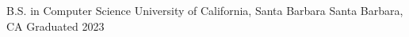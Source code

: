 \documentclass[12pt, letterpaper]{russell}
\begin{document}
\hfill
\begin{minipage}[t]{0.48\textwidth}
\begin{cvskills}
\end{cvskills}
\end{minipage}
\vspace{-0.3cm}

\vspace{-0.2cm}

\begin{cventries}

  \cventry
    {B.S. in Computer Science} %
    {University of California, Santa Barbara} %
    {Santa Barbara, CA} %
    {Graduated 2023} %
    { }


\end{cventries}
\end{document}
